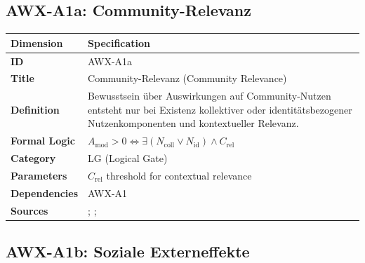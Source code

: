 
\subsection{AWX-A1a: Community-Relevanz}

\begin{table}[htbp]
\small
\begin{tabular}{p{3cm}p{11cm}}
\toprule
\textbf{Dimension} & \textbf{Specification} \\
\midrule
\textbf{ID} & AWX-A1a \\
\textbf{Title} & Community-Relevanz (Community Relevance) \\
\textbf{Definition} & Bewusstsein über Auswirkungen auf Community-Nutzen entsteht nur bei Existenz kollektiver oder identitätsbezogener Nutzenkomponenten und kontextueller Relevanz. \\
\textbf{Formal Logic} & $A_{\text{mod}} > 0 \Leftrightarrow \exists(N_{\text{coll}} \lor N_{\text{id}}) \land C_{\text{rel}}$ \\
\textbf{Category} & LG (Logical Gate) \\
\textbf{Parameters} & $C_{\text{rel}}$ threshold for contextual relevance \\
\textbf{Dependencies} & AWX-A1 \\
\textbf{Sources} & \citet{PAP-fehr1999fairness}; \citet{PAP-fehr2004social}; \citet{PAP-akerlof2000identity} \\
\bottomrule
\end{tabular}
\end{table}


\subsection{AWX-A1b: Soziale Externeffekte}

